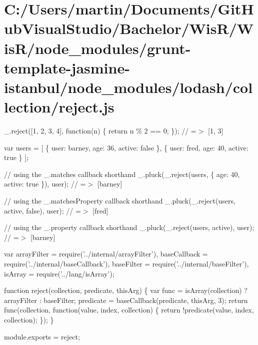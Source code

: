 \hypertarget{_c_1_2_users_2martin_2_documents_2_git_hub_visual_studio_2_bachelor_2_wis_r_2_wis_r_2node_module24b6cc419a6a476b43580c632369e9ab}{}\section{C\+:/\+Users/martin/\+Documents/\+Git\+Hub\+Visual\+Studio/\+Bachelor/\+Wis\+R/\+Wis\+R/node\+\_\+modules/grunt-\/template-\/jasmine-\/istanbul/node\+\_\+modules/lodash/collection/reject.\+js}
\+\_\+.\+reject(\mbox{[}1, 2, 3, 4\mbox{]}, function(n) \{ return n \% 2 == 0; \}); // =$>$ \mbox{[}1, 3\mbox{]}

var users = \mbox{[} \{ \textquotesingle{}user\textquotesingle{}\+: \textquotesingle{}barney\textquotesingle{}, \textquotesingle{}age\textquotesingle{}\+: 36, \textquotesingle{}active\textquotesingle{}\+: false \}, \{ \textquotesingle{}user\textquotesingle{}\+: \textquotesingle{}fred\textquotesingle{}, \textquotesingle{}age\textquotesingle{}\+: 40, \textquotesingle{}active\textquotesingle{}\+: true \} \mbox{]};

// using the {\ttfamily \+\_\+.\+matches} callback shorthand \+\_\+.\+pluck(\+\_\+.\+reject(users, \{ \textquotesingle{}age\textquotesingle{}\+: 40, \textquotesingle{}active\textquotesingle{}\+: true \}), \textquotesingle{}user\textquotesingle{}); // =$>$ \mbox{[}\textquotesingle{}barney\textquotesingle{}\mbox{]}

// using the {\ttfamily \+\_\+.\+matches\+Property} callback shorthand \+\_\+.\+pluck(\+\_\+.\+reject(users, \textquotesingle{}active\textquotesingle{}, false), \textquotesingle{}user\textquotesingle{}); // =$>$ \mbox{[}\textquotesingle{}fred\textquotesingle{}\mbox{]}

// using the {\ttfamily \+\_\+.\+property} callback shorthand \+\_\+.\+pluck(\+\_\+.\+reject(users, \textquotesingle{}active\textquotesingle{}), \textquotesingle{}user\textquotesingle{}); // =$>$ \mbox{[}\textquotesingle{}barney\textquotesingle{}\mbox{]}


\begin{DoxyCodeInclude}
var arrayFilter = require(\textcolor{stringliteral}{'../internal/arrayFilter'}),
    baseCallback = require(\textcolor{stringliteral}{'../internal/baseCallback'}),
    baseFilter = require(\textcolor{stringliteral}{'../internal/baseFilter'}),
    isArray = require(\textcolor{stringliteral}{'../lang/isArray'});

\textcolor{keyword}{function} reject(collection, predicate, thisArg) \{
  var func = isArray(collection) ? arrayFilter : baseFilter;
  predicate = baseCallback(predicate, thisArg, 3);
  \textcolor{keywordflow}{return} func(collection, \textcolor{keyword}{function}(value, index, collection) \{
    \textcolor{keywordflow}{return} !predicate(value, index, collection);
  \});
\}

module.exports = reject;
\end{DoxyCodeInclude}
 